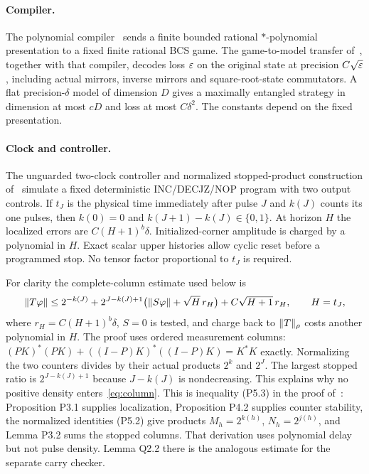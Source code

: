 \paragraph{Compiler.}
The polynomial compiler~\cite[Theorem 3.1]{UP} sends a finite bounded rational $*$-polynomial presentation to a fixed finite rational BCS game. The game-to-model transfer of~\cite[Theorem 4.9 and Proposition 6.1]{Precision}, together with that compiler, decodes loss $\varepsilon$ on the original state at precision $C\sqrt{\varepsilon}$, including actual mirrors, inverse mirrors and square-root-state commutators. A flat precision-$\delta$ model of dimension $D$ gives a maximally entangled strategy in dimension at most $cD$ and loss at most $C\delta^2$. The constants depend on the fixed presentation.

\paragraph{Clock and controller.}
The unguarded two-clock controller and normalized stopped-product construction of~\cite[Sections P3--P5]{UP} simulate a fixed deterministic INC/DECJZ/NOP program with two output controls. If $t_J$ is the physical time immediately after pulse $J$ and $k(J)$ counts its one pulses, then $k(0)=0$ and $k(J+1)-k(J)\in\{0,1\}$. At horizon $H$ the localized errors are $C(H+1)^b\delta$. Initialized-corner amplitude is charged by a polynomial in $H$. Exact scalar upper histories allow cyclic reset before a programmed stop. No tensor factor proportional to $t_J$ is required.

For clarity the complete-column estimate used below is
\begin{equation}\label{eq:column}
 \lVert T\varphi\rVert\le 2^{-k(J)}+
 2^{J-k(J)+1}\bigl(\lVert S\varphi\rVert+\sqrt H\,r_H\bigr)
 +C\sqrt{H+1}\,r_H,\qquad H=t_J,
\end{equation}
where $r_H=C(H+1)^b\delta$, $S=0$ is tested, and charge back to $\lVert T\rVert_\rho$ costs another polynomial in $H$. The proof uses ordered measurement columns: $(PK)^*(PK)+((I-P)K)^*((I-P)K)=K^*K$ exactly. Normalizing the two counters divides by their actual products $2^{k}$ and $2^J$. The largest stopped ratio is $2^{J-k(J)+1}$ because $J-k(J)$ is nondecreasing. This explains why no positive density enters~\eqref{eq:column}. This is inequality (P5.3) in the proof of~\cite[Proposition P5.1]{UP}: Proposition P3.1 supplies localization, Proposition P4.2 supplies counter stability, the normalized identities (P5.2) give products $M_h=2^{k(h)}$, $N_h=2^{j(h)}$, and Lemma P3.2 sums the stopped columns. That derivation uses polynomial delay but not pulse density. Lemma Q2.2 there is the analogous estimate for the separate carry checker.

